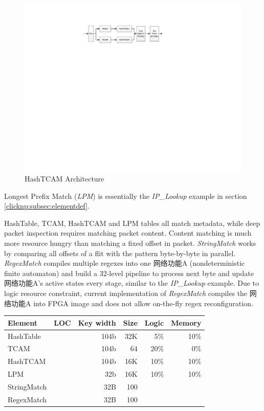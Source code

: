 \begin{figure}[h!]
	\centering
	\includegraphics[width=1.0\columnwidth]{image/HashTCAM}
	\vspace{-0.30in}
	\caption{HashTCAM Architecture}
	\vspace{-0.10in}
	\label{clicknp:fig:HashTCAM}
\end{figure}

Longest Prefix Match (\textit{LPM}) is essentially the \textit{IP\_Lookup} example in section \ref{clicknp:subsec:elementdef}.

HashTable, TCAM, HashTCAM and LPM tables all match metadata, while deep packet inspection requires matching packet content. Content matching is much more resource hungry than matching a fixed offset in packet. \textit{StringMatch} works by comparing all offsets of a flit with the pattern byte-by-byte in parallel. \textit{RegexMatch} compiles multiple regexes into one 网络功能A (nondeterministic finite automaton) and build a 32-level pipeline to process next byte and update 网络功能A's active states every stage, similar to the \textit{IP\_Lookup} example. Due to logic resource constraint, current implementation of \textit{RegexMatch} compiles the 网络功能A into FPGA image and does not allow on-the-fly regex reconfiguration.

\begin{table}[h!]
	\centering
	\label{clicknp:tab:LookupTables}
	\begin{tabular}{l|r|r|r|r|r}
		Element & LOC & Key width & Size & Logic & Memory \\
		\hline
		HashTable 	& & 104b & 32K 	& 5\%  & 10\% \\
		TCAM 		& & 104b & 64	& 20\% & 0\% \\
		HashTCAM 	& & 104b & 16K    & 10\% & 10\% \\
		LPM			& & 32b  & 16K    & 10\% & 10\% \\
		StringMatch & & 32B  & 100	& & \\
		RegexMatch  & & 32B  & 100  & & \\
	\end{tabular}
\end{table}

